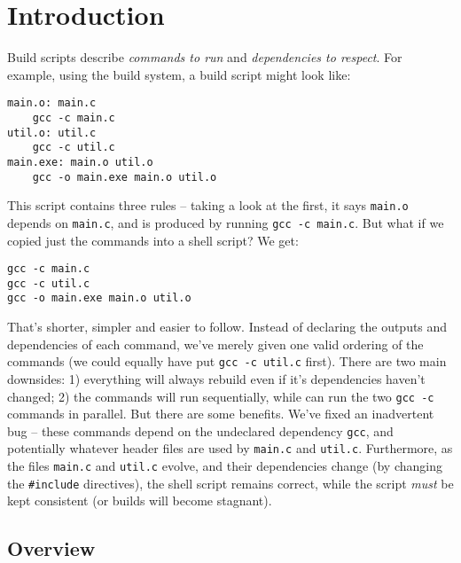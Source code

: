 \section{Introduction}
\label{sec:introduction}

Build scripts \cite{build_systems_a_la_carte} describe \emph{commands to run} and \emph{dependencies to respect}. For example, using the \Make build system, a build script might look like:

\vspace{3mm}
\begin{verbatim}
main.o: main.c
    gcc -c main.c
util.o: util.c
    gcc -c util.c
main.exe: main.o util.o
    gcc -o main.exe main.o util.o
\end{verbatim}
\vspace{3mm}

This script contains three rules -- taking a look at the first, it says \texttt{main.o} depends on \texttt{main.c}, and is produced by running \texttt{gcc -c main.c}. But what if we copied just the commands into a shell script? We get:

\vspace{3mm}
\begin{verbatim}
gcc -c main.c
gcc -c util.c
gcc -o main.exe main.o util.o
\end{verbatim}
\vspace{3mm}

That's shorter, simpler and easier to follow. Instead of declaring the outputs and dependencies of each command, we've merely given one valid ordering of the commands (we could equally have put \texttt{gcc -c util.c} first). There are two main downsides: 1) everything will always rebuild even if it's dependencies haven't changed; 2) the commands will run sequentially, while \Make can run the two \texttt{gcc -c} commands in parallel. But there are some benefits. We've fixed an inadvertent bug -- these commands depend on the undeclared dependency \texttt{gcc}, and potentially whatever header files are used by \texttt{main.c} and \texttt{util.c}. Furthermore, as the files \texttt{main.c} and \texttt{util.c} evolve, and their dependencies change (by changing the \texttt{\#include} directives), the shell script remains correct, while the \Make script \emph{must} be kept consistent (or builds will become stagnant).

\subsection{Overview}


